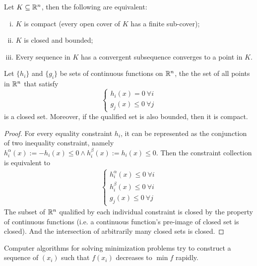 \documentclass{article}
\begin{document}
    \begin{theorem}
    	Let $K \subseteq \mathbb{R}^n$, then the following are equivalent:
    	\begin{enumerate}[(i)]
    		\item $K$ is compact (every open cover of $K$ has a finite sub-cover);
    		\item $K$ is closed and bounded;
    		\item Every sequence in $K$ has a convergent subsequence converges to a point in $K$.
    	\end{enumerate}
    \end{theorem}
    
	\begin{proposition}
		Let $\{h_i\}$ and $\{g_i\}$ be sets of continuous functions on $\mathbb{R}^n$, the the set of all points in $\mathbb{R}^n$ that satisfy
		\begin{equation}
			\begin{cases}
				h_i(x) = 0\ \forall i\\
				g_j(x) \leq 0\ \forall j
			\end{cases}
		\end{equation}
		is a closed set. Moreover, if the qualified set is also bounded, then it is compact.
	\end{proposition}
	
	\begin{proof}
		For every equality constraint $h_i$, it can be represented as the conjunction of two inequality constraint, namely $h_i^\alpha (x) := -h_i(x) \leq 0 \land h_i^\beta (x) := h_i(x) \leq 0$. Then the constraint collection is equivalent to
		\begin{align}
			\begin{cases}
				h_i^\alpha (x) \leq 0\ \forall i \\
				h_i^\beta (x) \leq 0\ \forall i \\
				g_j(x) \leq 0\ \forall j
			\end{cases}
		\end{align}
		The subset of $\mathbb{R}^n$ qualified by each individual constraint is closed by the property of continuous functions (i.e. a continuous function's pre-image of closed set is closed). And the intersection of arbitrarily many closed sets is closed.
	\end{proof}
	
    \begin{remark}
    	Computer algorithms for solving minimization problems try to construct a sequence of $(x_i)$ such that $f(x_i)$ decreases to $\min f$ rapidly.
    \end{remark}
    
\end{document}

